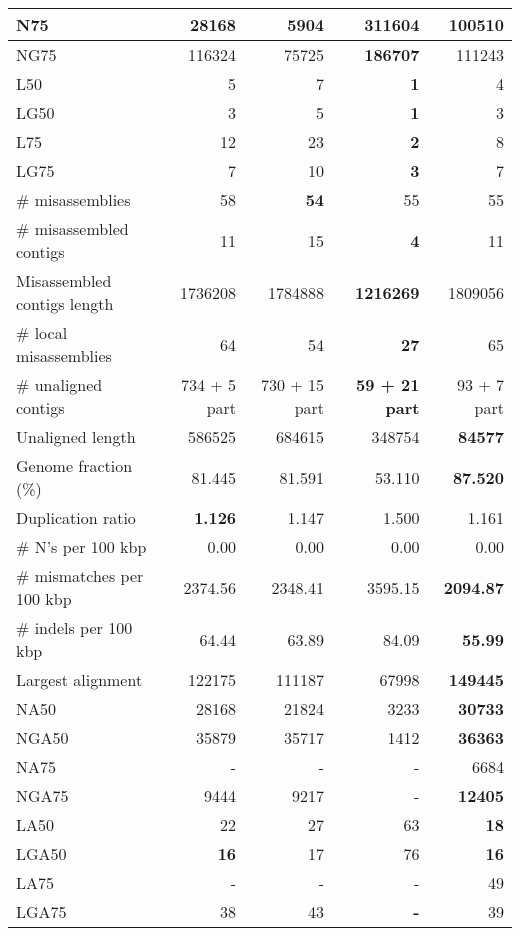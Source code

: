 \documentclass[12pt,a4paper]{article}
\begin{document}
\begin{table}[ht]
\begin{center}
\begin{tabular}{|l*{4}{|r}|}
N75 & 28168 & 5904 & {\bf 311604} & 100510 \\ \hline
NG75 & 116324 & 75725 & {\bf 186707} & 111243 \\ \hline
L50 & 5 & 7 & {\bf 1} & 4 \\ \hline
LG50 & 3 & 5 & {\bf 1} & 3 \\ \hline
L75 & 12 & 23 & {\bf 2} & 8 \\ \hline
LG75 & 7 & 10 & {\bf 3} & 7 \\ \hline
\# misassemblies & 58 & {\bf 54} & 55 & 55 \\ \hline
\# misassembled contigs & 11 & 15 & {\bf 4} & 11 \\ \hline
Misassembled contigs length & 1736208 & 1784888 & {\bf 1216269} & 1809056 \\ \hline
\# local misassemblies & 64 & 54 & {\bf 27} & 65 \\ \hline
\# unaligned contigs & 734 + 5 part & 730 + 15 part & {\bf 59 + 21 part} & 93 + 7 part \\ \hline
Unaligned length & 586525 & 684615 & 348754 & {\bf 84577} \\ \hline
Genome fraction (\%) & 81.445 & 81.591 & 53.110 & {\bf 87.520} \\ \hline
Duplication ratio & {\bf 1.126} & 1.147 & 1.500 & 1.161 \\ \hline
\# N's per 100 kbp & 0.00 & 0.00 & 0.00 & 0.00 \\ \hline
\# mismatches per 100 kbp & 2374.56 & 2348.41 & 3595.15 & {\bf 2094.87} \\ \hline
\# indels per 100 kbp & 64.44 & 63.89 & 84.09 & {\bf 55.99} \\ \hline
Largest alignment & 122175 & 111187 & 67998 & {\bf 149445} \\ \hline
NA50 & 28168 & 21824 & 3233 & {\bf 30733} \\ \hline
NGA50 & 35879 & 35717 & 1412 & {\bf 36363} \\ \hline
NA75 & - & - & - & 6684 \\ \hline
NGA75 & 9444 & 9217 & - & {\bf 12405} \\ \hline
LA50 & 22 & 27 & 63 & {\bf 18} \\ \hline
LGA50 & {\bf 16} & 17 & 76 & {\bf 16} \\ \hline
LA75 & - & - & - & 49 \\ \hline
LGA75 & 38 & 43 & {\bf -} & 39 \\ \hline
\end{tabular}
\end{center}
\end{table}
\end{document}
